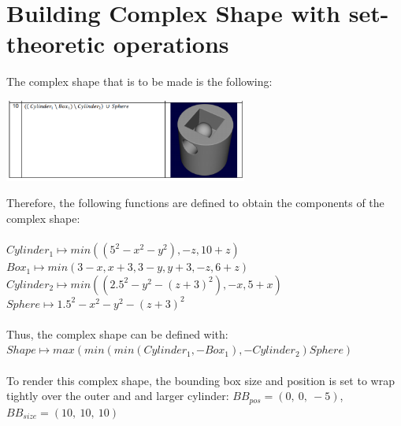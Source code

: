\documentclass[acmlarge,nonacm=true]{acmart}
\begin{document}
\section{Building Complex Shape with set-theoretic operations}
The complex shape that is to be made is the following:\\
\begin{center}
	\includegraphics[width = 0.6\textwidth]{fig/2}
\end{center}
Therefore, the following functions are defined to obtain the components of the complex shape:\\\\
$Cylinder_1\mapsto min((5^2 - x^2 - y^2), -z, 10+z)$\\
$Box_1\mapsto min(3-x, x+3, 3-y, y+3, -z, 6+z)$\\
$Cylinder_2\mapsto min((2.5^2 - y^2 - (z+3)^2), -x, 5+x)$\\
$Sphere \mapsto 1.5^2 - x^2 - y^2 - (z+3)^2$\\\\
Thus, the complex shape can be defined with:\\
$Shape \mapsto max(min(min(Cylinder_1, -Box_1), -Cylinder_2)Sphere)$\\\\

To render this complex shape, the bounding box size and position is set to wrap tightly 
over the outer and and larger cylinder: $BB_{pos} = (0,\ 0,\ -5)$, $BB_{size} = (10,\ 10,\ 10)$\\\\
\end{document}
